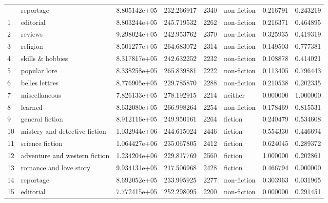 \documentclass[12pt,letterpaper,twoside]{article}
\begin{document}
\begin{landscape}
\begin{longtable}{llrrrlrr}
\bottomrule
\endlastfoot
0  &                      reportage &  8.805142e+05 &  232.266917 &  2340 &   non-fiction &    0.216791 &     0.243219 \\
1  &                      editorial &  8.803244e+05 &  245.719532 &  2262 &   non-fiction &    0.216371 &     0.464895 \\
2  &                        reviews &  9.298024e+05 &  242.953762 &  2370 &   non-fiction &    0.325935 &     0.419319 \\
3  &                       religion &  8.501277e+05 &  264.683072 &  2314 &   non-fiction &    0.149503 &     0.777381 \\
4  &               skills \& hobbies &  8.317817e+05 &  242.632252 &  2232 &   non-fiction &    0.108878 &     0.414021 \\
5  &                   popular lore &  8.338258e+05 &  265.839881 &  2222 &   non-fiction &    0.113405 &     0.796443 \\
6  &                 belles lettres &  8.776905e+05 &  229.785870 &  2288 &   non-fiction &    0.210538 &     0.202335 \\
7  &                  miscellaneous &  7.826133e+05 &  278.192915 &  2214 &       neither &    0.000000 &     1.000000 \\
8  &                        learned &  8.632080e+05 &  266.998264 &  2254 &   non-fiction &    0.178469 &     0.815531 \\
9  &                general fiction &  8.912116e+05 &  249.950161 &  2264 &       fiction &    0.240479 &     0.534608 \\
10 &  mistery and detective fiction &  1.032944e+06 &  244.615024 &  2446 &       fiction &    0.554330 &     0.446694 \\
11 &                science fiction &  1.064427e+06 &  235.067805 &  2412 &       fiction &    0.624045 &     0.289372 \\
12 &  adventure and western fiction &  1.234204e+06 &  229.817769 &  2560 &       fiction &    1.000000 &     0.202861 \\
13 &         romance and love story &  9.934131e+05 &  217.506968 &  2428 &       fiction &    0.466794 &     0.000000 \\
14 &                      reportage &  8.692052e+05 &  233.995925 &  2277 &   non-fiction &    0.303963 &     0.031965 \\
15 &                      editorial &  7.772415e+05 &  252.298095 &  2200 &   non-fiction &    0.000000 &     0.291451 \\

\end{longtable}
\end{landscape}
\end{document}
